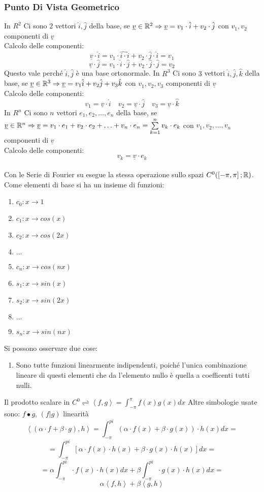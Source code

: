 \subsubsection{Punto Di Vista Geometrico}
In $R^2$ Ci sono $2$ vettori $\hat{i},\hat{j}$ della base, se $\underline{v}\in \mathbb{R}^2 \Rightarrow \underline{v}=v_1\cdot \hat{i}+v_2\cdot \hat{j}$ con $v_1,v_2$ componenti di $\underline{v}$\\
Calcolo delle componenti:\\
$$\underline{v}\cdot \hat{i} = v_1\cdot \hat{i\cdot }\hat{i}+v_2\cdot \hat{j}\cdot \hat{i}=v_1$$
$$\underline{v}\cdot \hat{j} = v_1\cdot \hat{i}\cdot \hat{j}+v_2\cdot \hat{j}\cdot \hat{j}=v_2$$
Questo vale perché $\hat{i},\hat{j}$ è una base ortonormale.
In $R^3$ Ci sono $3$ vettori $\hat{i},\hat{j},\hat{k}$ della base, se $\underline{v}\in \mathbb{R}^3 \Rightarrow \underline{v}=v_1\hat{i}+v_2\hat{j}+v_3\hat{k}$ con $v_1,v_2,v_3$ componenti di $\underline{v}$\\
Calcolo delle componenti:
$$ v_1=\underline{v}\cdot \hat{i}\quad v_2=\underline{v}\cdot \hat{j}\quad v_3=\underline{v}\cdot \hat{k}  $$
In $R^n$ Ci sono $n$ vettori $e_1,e_2,\ldots,e_n$ della base, se $\underline{v}\in \mathbb{R}^n \Rightarrow \underline{v}=v_1\cdot e_1+v_2\cdot e_2+\ldots+v_n\cdot e_n=\sum\limits_{k=1}^{n}v_k\cdot e_k$ con $v_1,v_2,\ldots,v_n$ componenti di $\underline{v}$\\
Calcolo delle componenti:
$$v_k=\underline{v}\cdot e_k$$
\\
Con le Serie di Fourier su esegue la stessa operazione sullo spazi $C^0(\left[-\pi,\pi\right]; \mathbb{R})$. Come elementi di base si ha un insieme di funzioni:
\begin{enumerate}
	\item $c_0:x\to 1$
	\item $c_1:x\to cos(x)$
	\item $c_2:x\to cos(2x)$
	\item $\ldots$
	\item $c_n:x\to cos(nx)$
	\item $s_1:x\to sin(x)$
	\item $s_2:x\to sin(2x)$
	\item $\ldots$
	\item $s_n:x\to sin(nx)$
\end{enumerate}
Si possono osservare due cose:
\begin{enumerate}
	\item Sono tutte funzioni linearmente indipendenti, poiché l'unica combinazione lineare di questi elementi che da l'elemento nullo è quella a coefficenti tutti nulli.
\end{enumerate}
Il prodotto scalare in $C^0 \rightleftharpoons \left<f,g\right>=\int_{-\pi}^{\pi}f(x)g(x)dx$
Altre simbologie usate sono: $ f\bullet g $, $(f|g)$
\observation linearità\\
$$\left<(\alpha\cdot f+\beta\cdot g), h \right>= \int_{-\pi}^{pi} (\alpha\cdot f(x)+\beta\cdot g(x))\cdot h(x) dx=$$
$$=\int_{-\pi}^{pi} \left[\alpha\cdot f(x)\cdot h(x)+\beta\cdot g(x)\cdot h(x) \right]dx= $$
$$=\alpha\int_{-\pi}^{pi} \cdot f(x)\cdot h(x) dx+\beta\int_{-\pi}^{pi} \cdot g(x)\cdot h(x) dx =$$
$$\alpha\left<f,h\right>+\beta\left<g,h\right>$$


